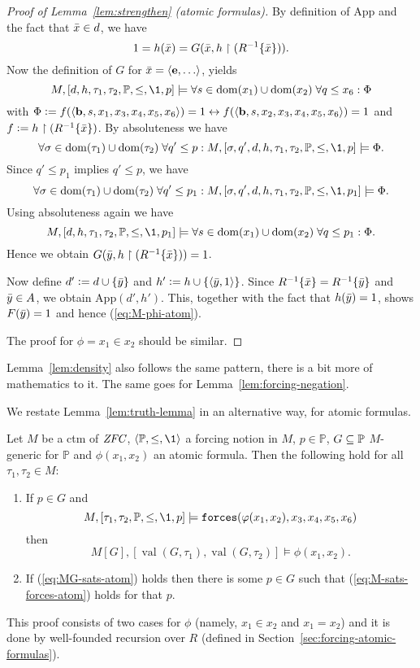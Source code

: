 \documentclass[11pt,english]{article}
\renewcommand{\PP}{\mathbb{P}}
\renewcommand{\app}{\mathrm{App}}
\newcommand{\forceisa}{\mathtt{forces}}
\newcommand{\equ}{\mathbf{e}}
\newcommand{\bel}{\mathbf{b}}
\DeclareMathOperator{\val}{val}
\begin{document}
\begin{proof}[Proof of  Lemma~\ref{lem:strengthen} (atomic formulas)]
  By  definition of $\app$ and the fact that $\bar{x}\in d$, we have
  \[
  1= h(\bar{x}) = G(\bar{x},h\upharpoonright(R^{-1}\{\bar{x}\})).
  \]
  Now the  definition of $G$ for $\bx=\lb\equ,\dots\rb$, yields
  \[
  M,[d,h,\tau_1,\tau_2,\PP,\leq,\1,p]\models \forall
  s\in\dom(x_1)\cup\dom(x_2)\;\forall q\leq x_6 : \Phi
  \]
  with $\Phi\defi
  f(\lb\bel,s,x_1,x_{3},x_{4},x_{5},x_{6}\rb) =1  \lsii
  f(\lb\bel,s,x_2,x_{3},x_{4},x_{5},x_{6}\rb) =1$ and 
  $f\mathrel{\mathop:}= h\upharpoonright(R^{-1}\{\bar{x}\})$.
  By absoluteness we have
  \[
  \forall
  \sigma\in\dom(\tau_1)\cup\dom(\tau_2)\;\forall q'\leq p :
  M,[\sigma,q',d,h,\tau_1,\tau_2,\PP,\leq,\1,p]\models  \Phi.
  \]
  Since $q'\leq p_1$ implies $q'\leq p$, we have
  \[
  \forall
  \sigma\in\dom(\tau_1)\cup\dom(\tau_2)\;\forall q'\leq p_1 :
  M,[\sigma,q',d,h,\tau_1,\tau_2,\PP,\leq,\1,p_1]\models  \Phi.
  \]
  Using absoluteness again we have
  \[
  M,[d,h,\tau_1,\tau_2,\PP,\leq,\1,p_1]\models \forall
  s\in\dom(x_1)\cup\dom(x_2)\;\forall q\leq p_1 : \Phi.
  \]
  Hence we obtain $G(\bar{y},h\upharpoonright(R^{-1}\{\bar{x}\}))=1$. 

  Now define   $d'\mathrel{\mathop:}= d\cup \{\bar{y}\}$  and $h'\mathrel{\mathop:}=
  h\cup\{\langle\bar{y},1\rangle\}$. Since
  $R^{-1}\{\bar{x}\} =R^{-1}\{\bar{y}\}$ and $\bar{y}\in A$, we obtain
  $\app(d',h')$. This, together with the fact that $h(\bar{y})=1$, shows
  $F(\bar{y})=1$ and hence (\ref{eq:M-phi-atom}).

  The proof for $\phi= x_1\in x_2$ should be similar.
\end{proof}
Lemma~\ref{lem:density} also follows the same pattern, there is a bit
more of mathematics to it. The same goes for
Lemma~\ref{lem:forcing-negation}.


We restate Lemma~\ref{lem:truth-lemma} in an alternative way, for
atomic formulas.
\begin{lemma}
  Let $M$ be a ctm of $\mathit{ZFC}$, $\lb\PP,\leq,\1\rb$ a forcing notion
  in $M$, $p\in\PP$, $G\sbq\PP$ $M$-generic for $\PP$ and $\phi(x_1,x_2)$ an
  atomic formula. Then the following hold for all
  $\tau_1,\tau_2\in M$:
  \begin{enumerate}
  \item If $p\in G$ and
    \begin{equation} \label{eq:M-sats-forces-atom}
      M,[\tau_1,\tau_2,\PP,\leq,\1,p] 
      \models\forceisa(\phi(x_1,x_2),x_{3},x_{4},x_{5},x_{6})
    \end{equation}
    then
    \begin{equation} \label{eq:MG-sats-atom}
      M[G],[\val(G,\tau_1),\val(G,\tau_2)]
      \models\phi(x_1,x_2).
    \end{equation}
  \item If (\ref{eq:MG-sats-atom}) holds 
    then there is some $p\in G$ such that
    (\ref{eq:M-sats-forces-atom}) holds for that $p$.
  \end{enumerate}
\end{lemma}
This proof consists of two cases for $\phi$ (namely, $x_1\in x_2$ and
$x_1=x_2$) and it is done by well-founded recursion over $R$ (defined
in Section~\ref{sec:forcing-atomic-formulas}).
\end{document}

